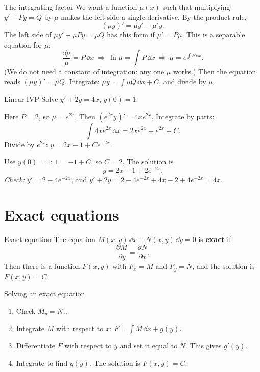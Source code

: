 \begin{derivbox}{The integrating factor}
We want a function $\mu(x)$ such that multiplying $y' + Py = Q$ by $\mu$ makes the left side a single derivative. By the product rule,
\[ (\mu y)' = \mu y' + \mu' y . \]
The left side of $\mu y' + \mu P y = \mu Q$ has this form if $\mu' = P\mu$. This is a separable equation for $\mu$:
\[ \frac{\dd\mu}{\mu} = P\,\dd x \ \Longrightarrow\ \ln\mu = \int P\,\dd x \ \Longrightarrow\ \mu = e^{\int P\,\dd x}. \]
(We do not need a constant of integration: any one $\mu$ works.) Then the equation reads $(\mu y)' = \mu Q$. Integrate: $\mu y = \int\mu Q\,\dd x + C$, and divide by $\mu$.
\end{derivbox}

\begin{examplebox}{Linear IVP}
Solve $y' + 2y = 4x$, \quad $y(0)=1$.

Here $P=2$, so $\mu = e^{2x}$. Then $(e^{2x}y)' = 4xe^{2x}$. Integrate by parts:
\[ \int 4xe^{2x}\,\dd x = 2xe^{2x} - e^{2x} + C. \]
Divide by $e^{2x}$: $y = 2x - 1 + Ce^{-2x}$.

Use $y(0)=1$: $1 = -1 + C$, so $C=2$. The solution is
\[ y = 2x - 1 + 2e^{-2x}. \]
\textit{Check:} $y' = 2 - 4e^{-2x}$, and $y' + 2y = 2 - 4e^{-2x} + 4x - 2 + 4e^{-2x} = 4x$. \checkmark
\end{examplebox}

\section{Exact equations}

\begin{defbox}{Exact equation}
The equation $M(x,y)\,\dd x + N(x,y)\,\dd y = 0$ is \textbf{exact} if
\[ \frac{\partial M}{\partial y} = \frac{\partial N}{\partial x}. \]
Then there is a function $F(x,y)$ with $F_x = M$ and $F_y = N$, and the solution is $F(x,y) = C$.
\end{defbox}

\begin{methodbox}{Solving an exact equation}
\begin{enumerate}
  \item Check $M_y = N_x$.
  \item Integrate $M$ with respect to $x$: $F = \int M\,\dd x + g(y)$.
  \item Differentiate $F$ with respect to $y$ and set it equal to $N$. This gives $g'(y)$.
  \item Integrate to find $g(y)$. The solution is $F(x,y)=C$.
\end{enumerate}
\end{methodbox}

